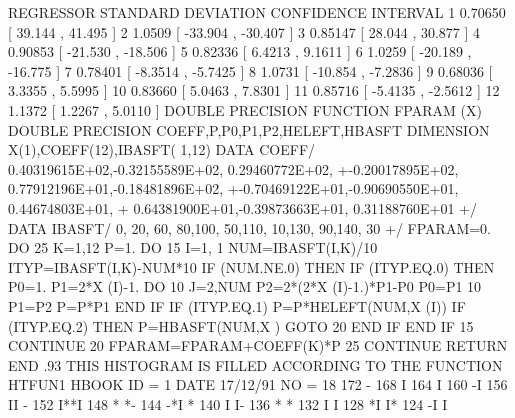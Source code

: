 \begin{Listing}
{ REGRESSOR  STANDARD DEVIATION     CONFIDENCE INTERVAL
     1          0.70650         [  39.144    ,  41.495    ]
     2           1.0509         [ -33.904    , -30.407    ]
     3          0.85147         [  28.044    ,  30.877    ]
     4          0.90853         [ -21.530    , -18.506    ]
     5          0.82336         [  6.4213    ,  9.1611    ]
     6           1.0259         [ -20.189    , -16.775    ]
     7          0.78401         [ -8.3514    , -5.7425    ]
     8           1.0731         [ -10.854    , -7.2836    ]
     9          0.68036         [  3.3355    ,  5.5995    ]
    10          0.83660         [  5.0463    ,  7.8301    ]
    11          0.85716         [ -5.4135    , -2.5612    ]
    12           1.1372         [  1.2267    ,  5.0110    ]
      DOUBLE PRECISION FUNCTION FPARAM (X)
      DOUBLE PRECISION COEFF,P,P0,P1,P2,HELEFT,HBASFT
      DIMENSION X(1),COEFF(12),IBASFT( 1,12)
      DATA COEFF/ 0.40319615E+02,-0.32155589E+02, 0.29460772E+02,
     +-0.20017895E+02, 0.77912196E+01,-0.18481896E+02,
     +-0.70469122E+01,-0.90690550E+01, 0.44674803E+01,
     + 0.64381900E+01,-0.39873663E+01, 0.31188760E+01
     +/
      DATA IBASFT/  0, 20, 60, 80,100, 50,110, 10,130, 90,140, 30
     +/
      FPARAM=0.
      DO 25 K=1,12
      P=1.
      DO 15 I=1, 1
      NUM=IBASFT(I,K)/10
      ITYP=IBASFT(I,K)-NUM*10
      IF (NUM.NE.0) THEN
      IF (ITYP.EQ.0) THEN
      P0=1.
      P1=2*X (I)-1.
      DO 10 J=2,NUM
      P2=2*(2*X (I)-1.)*P1-P0
      P0=P1
   10 P1=P2
      P=P*P1
      END IF
      IF (ITYP.EQ.1) P=P*HELEFT(NUM,X (I))
      IF (ITYP.EQ.2) THEN
      P=HBASFT(NUM,X )
      GOTO 20
      END IF
      END IF
   15 CONTINUE
   20 FPARAM=FPARAM+COEFF(K)*P
   25 CONTINUE
      RETURN
      END
}
\newpage\baselineskip.93\baselineskip\relax
 THIS HISTOGRAM IS FILLED ACCORDING TO THE FUNCTION HTFUN1                       
 HBOOK     ID =         1                                        DATE  17/12/91              NO =  18
      172                                    -
      168                                    I
      164                                    I
      160                                   -I
      156                                   II -
      152                                   I**I
      148                                   *  *-
      144                                 -*I   *
      140                                 I     I-
      136                                 *      *
      132                                 I      I
      128                                *I      I*
      124                                -I       I

\end{Listing}
